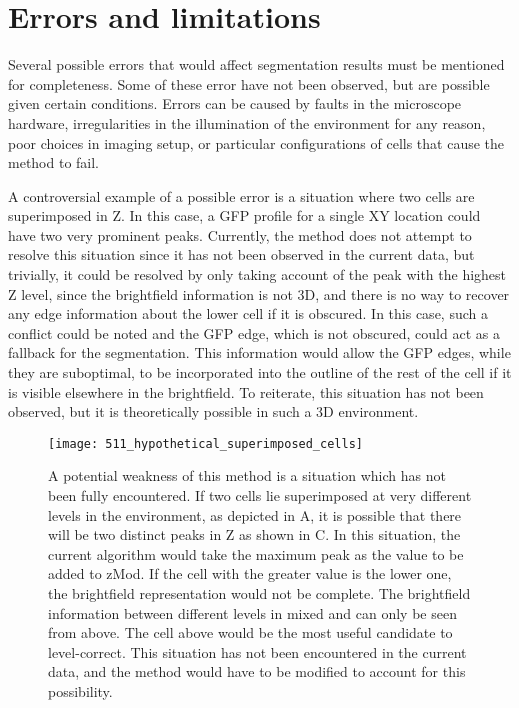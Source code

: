 \section{Errors and limitations}

Several possible errors that would affect segmentation results must be mentioned for completeness. Some of these error have not been observed, but are possible given certain conditions. Errors can be caused by faults in the microscope hardware, irregularities in the illumination of the environment for any reason, poor choices in imaging setup, or particular configurations of cells that cause the method to fail.

A controversial example of a possible error is a situation where two cells are superimposed in Z. In this case, a GFP profile for a single XY location could have two very prominent peaks. Currently, the method does not attempt to resolve this situation since it has not been observed in the current data, but trivially, it could be resolved by only taking account of the peak with the highest Z level, since the brightfield information is not 3D, and there is no way to recover any edge information about the lower cell if it is obscured. In this case, such a conflict could be noted and the GFP edge, which is not obscured, could act as a fallback for the segmentation. This information would allow the GFP edges, while they are suboptimal, to be incorporated into the outline of the rest of the cell if it is visible elsewhere in the brightfield. To reiterate, this situation has not been observed, but it is theoretically possible in such a 3D environment.

\begin{figure}[h!]
 \centering
 \texttt{[image: 511\_hypothetical\_superimposed\_cells]}
 \caption[Unaccounted for: superimposed cells]{
 	A potential weakness of this method is a situation which has not been fully encountered. If two cells lie superimposed at very different levels in the environment, as depicted in A, it is possible that there will be two distinct peaks in Z as shown in C. In this situation, the current algorithm would take the maximum peak as the value to be added to zMod. If the cell with the greater value is the lower one, the brightfield representation would not be complete. The brightfield information between different levels in mixed and can only be seen from above. The cell above would be the most useful candidate to level-correct. This situation has not been encountered in the current data, and the method would have to be modified to account for this possibility.
 }
 \label{fig:superimposedcells}
\end{figure}

